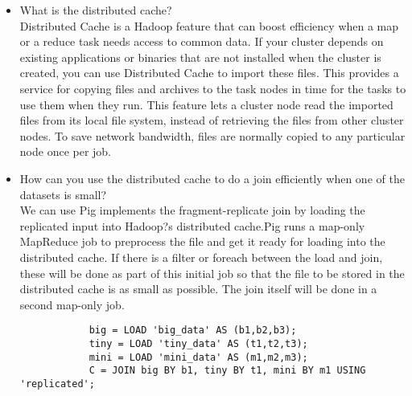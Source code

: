\documentclass[12pt]{article}
\begin{document}
	\begin{itemize}
		\item What is the distributed cache?\\
		Distributed Cache is a Hadoop feature that can boost efficiency when a map or a reduce task needs access to common data. If your cluster depends on existing applications or binaries that are not installed when the cluster is created, you can use Distributed Cache to import these files. This provides a service for copying files and archives to the task nodes in time for the tasks to use them when they run. This feature lets a cluster node read the imported files from its local file system, instead of retrieving the files from other cluster nodes. To save network bandwidth, files are normally copied to any particular node once per job. 
		
		\item How can you use the distributed cache to do a join efficiently when one of the datasets is small? \\
		We can use Pig implements the fragment-replicate join by loading the replicated input into Hadoop?s distributed cache.Pig runs a map-only MapReduce job to preprocess the file and get it ready for loading into the distributed cache. If there is a filter or foreach between the load and join, these will be done as part of this initial job so that the file to be stored in the distributed cache is as small as possible. The join itself will be done in a second map-only job.
		\begin{lstlisting}
			big = LOAD 'big_data' AS (b1,b2,b3);
			tiny = LOAD 'tiny_data' AS (t1,t2,t3);
			mini = LOAD 'mini_data' AS (m1,m2,m3);
			C = JOIN big BY b1, tiny BY t1, mini BY m1 USING 'replicated';
		\end{lstlisting}
	
	\end{itemize}
	
\end{document}
